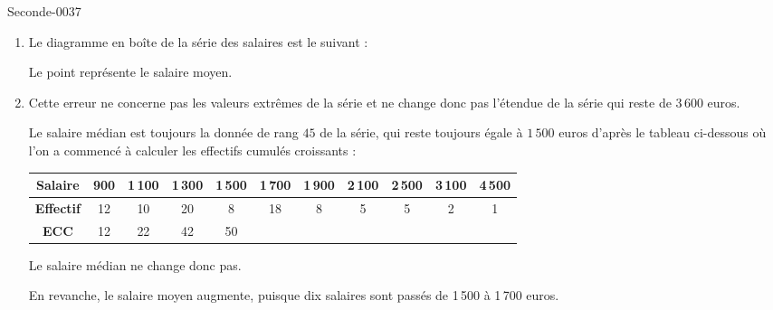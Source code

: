 \begin{corrige}{Seconde-0037}
\begin{enumerate}
\item Le diagramme en boîte de la série des salaires est le suivant :

    \begin{center}
   
    \end{center}
  
  Le point représente le salaire moyen.

\item Cette erreur ne concerne pas les valeurs extrêmes de la série et
  ne change donc pas l'étendue de la série qui reste de $3\,600$
  euros.

  Le salaire médian est toujours la donnée de rang $45$ de la série,
  qui reste toujours égale à $1\,500$ euros d'après le tableau
  ci-dessous où l'on a commencé à calculer les effectifs cumulés
  croissants : 


  \begin{center}
  \begin{tabular}{|c||c|c|c|c|c|c|c|c|c|c|}
    \hline 
    \textbf{Salaire} &900&1\,100&1\,300&1\,500&1\,700&1\,900&2\,100&2\,500&3\,100&4\,500\\
    \hline 
    \textbf{Effectif} &12&10&20&8&18&8&5&5&2&1\\
    \hline 
    \textbf{ECC} &12&22&42&50&&&&&&\\
    \hline
  \end{tabular}
  \end{center}

  Le salaire médian ne change donc pas.

  \smallskip

  En revanche, le salaire moyen augmente, puisque dix salaires sont
  passés de 1\,500 à 1\,700 euros.
  
\end{enumerate}


\end{corrige}
